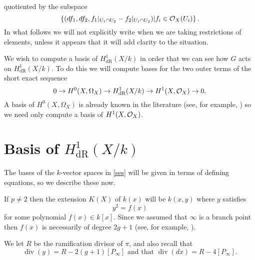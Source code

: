 \documentclass[draft, 11pt]{article} %
\theoremstyle{plain}
\theoremstyle{remark}
\newcommand{\cO}{{\cal O}}
\newcommand{\ra}{\rightarrow}
\newcommand{\derhamhone}{H_{\text {dR}}^1(X/k)}
\DeclareMathOperator{\di}{div}
\begin{document}
quotiented by the subspace
\[
\left\{  (df_1, df_2, f_1|_{U_1\cap U_2} -f_2|_{U_1\cap U_2} )|f_i \in \cO_X(U_i)\right\}.
\]
In what follows we will not explicitly write when we are taking restrictions of elements, unless it appears that it will add clarity to the situation.

We wish to compute a basis of $\derhamhone$ in order that we can see how $G$ acts on $\derhamhone$.
To do this we will compute bases for the two outer terms of the short exact sequence
\begin{equation}\label{ses}
0 \ra H^0(X,\Omega_X) \ra \derhamhone \ra H^1(X,\cO_X) \ra 0.
\end{equation}
A basis of $H^0(X,\Omega_X)$ is already known in the literature (see, for example, \cite[Prop. 7.4.26]{liu}) so we need only compute a basis of $H^1(X,\cO_X)$.

\begin{comment}
In order to do this we will need to use Serre duality, which we briefly remind the reader of presently.
Serre duality states that $H^0(X,\Omega_X)$ and $H^1(X,\cO_X)$ are dual to each other, and that there is a canonical map ${\text Res}:H^0(X,\omega_X) \times H^1(X,\cO_X) \rightarrow k$.
Details of the definition of ${\text Res}$ can be found in appendix B of \todo{in progress}
\todo[inline]{add details - in particular, relate to the basis we have for de rham}
\end{comment}
\section{Basis of $\derhamhone$}

The bases of the $k$-vector spaces in \eqref{ses} will be given in terms of defining equations, so we describe these now.

If $p \neq 2$ then the extension $K(X)$ of $k(x)$ will be $k(x,y)$ where $y$ satisfies
\begin{equation}\label{definingequationpnot2}
y^2 = f(x)
\end{equation}
for some polynomial $f(x) \in k[x]$.
Since we assumed that $\infty$ is a branch point then $f(x)$ is necessarily of degree $2g+1$ (see, for example, \cite[Prop. 7.4.24]{liu}).

We let $R$ be the ramification divisor of $\pi$, and also recall that 
\begin{equation}\label{pnot2divisors}
\di(y)  = R - 2(g+1)[P_\infty] \text{ and that } \di( dx) = R - 4[P_\infty].
\end{equation}
\end{document}
